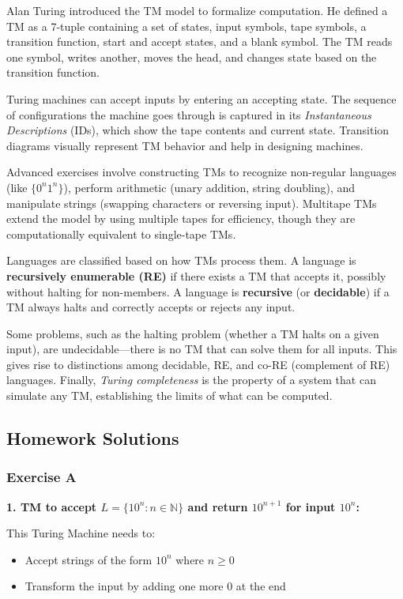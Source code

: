\documentclass{article}
\begin{document}
Alan Turing introduced the TM model to formalize computation. He defined a TM as a 7-tuple containing a set of states, input symbols, tape symbols, a transition function, start and accept states, and a blank symbol. The TM reads one symbol, writes another, moves the head, and changes state based on the transition function.

Turing machines can accept inputs by entering an accepting state. The sequence of configurations the machine goes through is captured in its \textit{Instantaneous Descriptions} (IDs), which show the tape contents and current state. Transition diagrams visually represent TM behavior and help in designing machines.

Advanced exercises involve constructing TMs to recognize non-regular languages (like $\{0^n1^n\}$), perform arithmetic (unary addition, string doubling), and manipulate strings (swapping characters or reversing input). Multitape TMs extend the model by using multiple tapes for efficiency, though they are computationally equivalent to single-tape TMs.

Languages are classified based on how TMs process them. A language is \textbf{recursively enumerable (RE)} if there exists a TM that accepts it, possibly without halting for non-members. A language is \textbf{recursive} (or \textbf{decidable}) if a TM always halts and correctly accepts or rejects any input.

Some problems, such as the halting problem (whether a TM halts on a given input), are undecidable—there is no TM that can solve them for all inputs. This gives rise to distinctions among decidable, RE, and co-RE (complement of RE) languages. Finally, \textit{Turing completeness} is the property of a system that can simulate any TM, establishing the limits of what can be computed.

\subsection{Homework Solutions}

\subsubsection{Exercise A}

\textbf{1. TM to accept $L = \{10^n : n \in \mathbb{N}\}$ and return $10^{n+1}$ for input $10^n$:}

This Turing Machine needs to:
\begin{itemize}
\item Accept strings of the form $10^n$ where $n \geq 0$
\item Transform the input by adding one more 0 at the end
\end{itemize}
\end{document}
